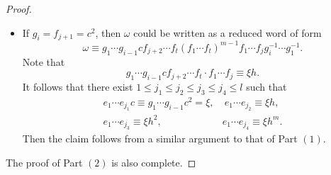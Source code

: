 \documentclass[10pt,a4paper]{amsart}
\begin{document}
\begin{proof}
\begin{itemize}
        \item If $g_i=f_{j+1}=c^2$, then $\omega$ could be written as a reduced word of form 
        $$\omega\equiv g_1\cdots g_{i-1}cf_{j+2}\cdots f_t\left(f_1\cdots f_t\right)^{m-1}f_1\cdots f_j g_i^{-1}\cdots g_1^{-1}.$$
        Note that
        \[ g_1\cdots g_{i-1}cf_{j+2}\cdots f_t \cdot f_1\cdots f_j \equiv \xi h.\]
        It follows that there exist $1\leq j_1\leq j_2\leq j_3\leq j_4\leq l$ such that
        $$\begin{matrix}e_1\cdots e_{j_1}c\equiv g_1\cdots g_{i-1}c^2= \xi, & \ e_1\cdots e_{j_2}\equiv \xi h,
        \\
        e_1\cdots e_{j_3}\equiv \xi h^2, & e_1\cdots e_{j_4}\equiv \xi h^m.\end{matrix}$$
        Then the claim follows from a similar argument to that of Part $(1)$.
        \end{itemize}
        
        The proof of Part $(2)$ is also complete.
    \end{proof}
\end{document}
